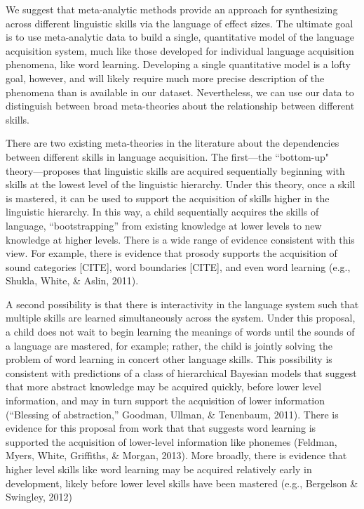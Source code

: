 \documentclass[english,floatsintext,man]{apa6}
\begin{document}
We suggest that meta-analytic methods provide an approach for
synthesizing across different linguistic skills via the language of
effect sizes. The ultimate goal is to use meta-analytic data to build a
single, quantitative model of the language acquisition system, much like
those developed for individual language acquisition phenomena, like word
learning. Developing a single quantitative model is a lofty goal,
however, and will likely require much more precise description of the
phenomena than is available in our dataset. Nevertheless, we can use our
data to distinguish between broad meta-theories about the relationship
between different skills.

There are two existing meta-theories in the literature about the
dependencies between different skills in language acquisition. The
first---the ``bottom-up" theory---proposes that linguistic skills are
acquired sequentially beginning with skills at the lowest level of the
linguistic hierarchy. Under this theory, once a skill is mastered, it
can be used to support the acquisition of skills higher in the
linguistic hierarchy. In this way, a child sequentially acquires the
skills of language, \enquote{bootstrapping} from existing knowledge at
lower levels to new knowledge at higher levels. There is a wide range of
evidence consistent with this view. For example, there is evidence that
prosody supports the acquisition of sound categories {[}CITE{]}, word
boundaries {[}CITE{]}, and even word learning (e.g., Shukla, White, \&
Aslin, 2011).

A second possibility is that there is interactivity in the language
system such that multiple skills are learned simultaneously across the
system. Under this proposal, a child does not wait to begin learning the
meanings of words until the sounds of a language are mastered, for
example; rather, the child is jointly solving the problem of word
learning in concert other language skills. This possibility is
consistent with predictions of a class of hierarchical Bayesian models
that suggest that more abstract knowledge may be acquired quickly,
before lower level information, and may in turn support the acquisition
of lower information (``Blessing of abstraction,'' Goodman, Ullman, \&
Tenenbaum, 2011). There is evidence for this proposal from work that
that suggests word learning is supported the acquisition of lower-level
information like phonemes (Feldman, Myers, White, Griffiths, \& Morgan,
2013). More broadly, there is evidence that higher level skills like
word learning may be acquired relatively early in development, likely
before lower level skills have been mastered (e.g., Bergelson \&
Swingley, 2012)
\end{document}
